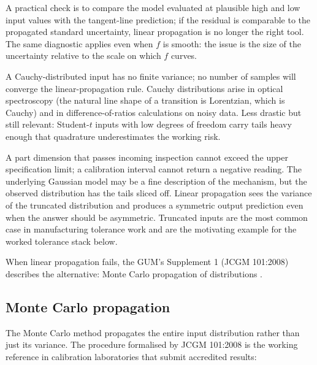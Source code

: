  A
practical check is to compare the model evaluated at plausible high
and low input values with the tangent-line prediction; if the
residual is comparable to the propagated standard uncertainty,
linear propagation is no longer the right tool. The same diagnostic
applies even when $f$ is smooth: the issue is the size of the
uncertainty relative to the scale on which $f$ curves.

 A Cauchy-distributed input has
no finite variance; no number of samples will converge the
linear-propagation rule. Cauchy distributions arise in optical
spectroscopy (the natural line shape of a transition is Lorentzian,
which is Cauchy) and in difference-of-ratios calculations on noisy
data. Less drastic but still relevant: Student-$t$ inputs with low
degrees of freedom carry tails heavy enough that quadrature
underestimates the working risk.

 A part dimension that passes
incoming inspection cannot exceed the upper specification limit; a
calibration interval cannot return a negative reading. The
underlying Gaussian model may be a fine description of the
mechanism, but the observed distribution has the tails sliced off.
Linear propagation sees the variance of the truncated distribution
and produces a symmetric output prediction even when the answer
should be asymmetric. Truncated inputs are the most common case in
manufacturing tolerance work and are the motivating example for the
worked tolerance stack below.

When linear propagation fails, the GUM's Supplement 1
(JCGM 101:2008) describes the alternative: Monte Carlo propagation
of distributions \cite{std:jcgm-101}.

\subsection{Monte Carlo propagation}

The Monte Carlo method propagates the entire input distribution
rather than just its variance. The procedure formalised by
JCGM 101:2008 \cite{std:jcgm-101} is the working reference in
calibration laboratories that submit accredited results:

